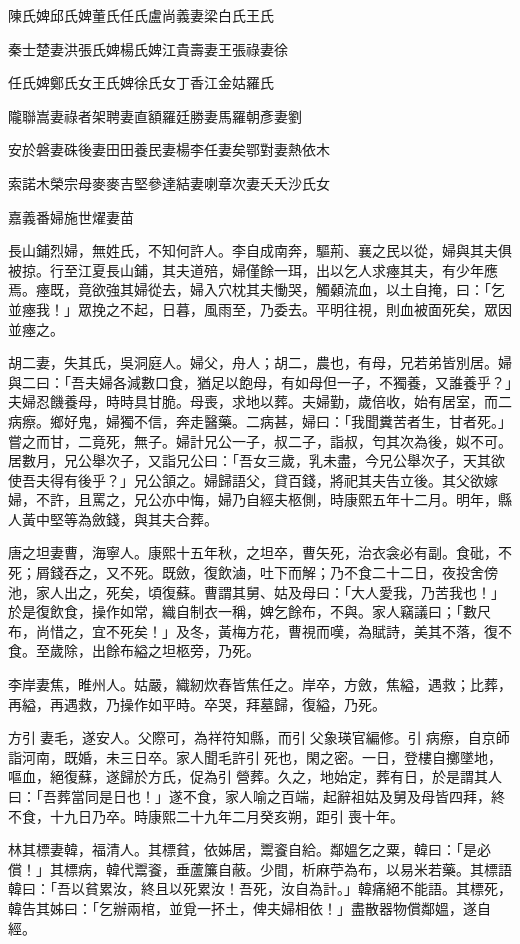 \begin{pinyinscope}
陳氏婢邱氏婢董氏任氏盧尚義妻梁白氏王氏

秦士楚妻洪張氏婢楊氏婢江貴壽妻王張祿妻徐

任氏婢鄭氏女王氏婢徐氏女丁香江金姑羅氏

隴聯嵩妻祿者架聘妻直額羅廷勝妻馬羅朝彥妻劉

安於磐妻硃後妻田田養民妻楊李任妻矣鄂對妻熱依木

索諾木榮宗母麥麥吉堅參達結妻喇章次妻夭夭沙氏女

嘉義番婦施世燿妻苗

長山鋪烈婦，無姓氏，不知何許人。李自成南奔，驅荊、襄之民以從，婦與其夫俱被掠。行至江夏長山鋪，其夫道殕，婦僅餘一珥，出以乞人求瘞其夫，有少年應焉。瘞既，竟欲強其婦從去，婦入穴枕其夫慟哭，觸顙流血，以土自掩，曰：「乞並瘞我！」眾挽之不起，日暮，風雨至，乃委去。平明往視，則血被面死矣，眾因並瘞之。

胡二妻，失其氏，吳洞庭人。婦父，舟人；胡二，農也，有母，兄若弟皆別居。婦與二曰：「吾夫婦各減數口食，猶足以飽母，有如母但一子，不獨養，又誰養乎？」夫婦忍饑養母，時時具甘脆。母喪，求地以葬。夫婦勤，歲倍收，始有居室，而二病瘵。鄉好鬼，婦獨不信，奔走醫藥。二病甚，婦曰：「我聞糞苦者生，甘者死。」嘗之而甘，二竟死，無子。婦計兄公一子，叔二子，詣叔，匄其次為後，姒不可。居數月，兄公舉次子，又詣兄公曰：「吾女三歲，乳未盡，今兄公舉次子，天其欲使吾夫得有後乎？」兄公頷之。婦歸語父，貸百錢，將祀其夫告立後。其父欲嫁婦，不許，且罵之，兄公亦中悔，婦乃自經夫柩側，時康熙五年十二月。明年，縣人黃中堅等為斂錢，與其夫合葬。

唐之坦妻曹，海寧人。康熙十五年秋，之坦卒，曹矢死，治衣衾必有副。食砒，不死；屑錢吞之，又不死。既斂，復飲滷，吐下而解；乃不食二十二日，夜投舍傍池，家人出之，死矣，頃復蘇。曹謂其舅、姑及母曰：「大人愛我，乃苦我也！」於是復飲食，操作如常，織自制衣一稱，婢乞餘布，不與。家人竊議曰；「數尺布，尚惜之，宜不死矣！」及冬，黃梅方花，曹視而嘆，為賦詩，美其不落，復不食。至歲除，出餘布縊之坦柩旁，乃死。

李岸妻焦，睢州人。姑嚴，織紉炊舂皆焦任之。岸卒，方斂，焦縊，遇救；比葬，再縊，再遇救，乃操作如平時。卒哭，拜墓歸，復縊，乃死。

方引妻毛，遂安人。父際可，為祥符知縣，而引父象瑛官編修。引病瘵，自京師詣河南，既婚，未三日卒。家人聞毛許引死也，閑之密。一日，登樓自擲墜地，嘔血，絕復蘇，遂歸於方氏，促為引營葬。久之，地始定，葬有日，於是謂其人曰：「吾葬當同是日也！」遂不食，家人喻之百端，起辭祖姑及舅及母皆四拜，終不食，十九日乃卒。時康熙二十九年二月癸亥朔，距引喪十年。

林其標妻韓，福清人。其標貧，依姊居，鬻餈自給。鄰媼乞之粟，韓曰：「是必償！」其標病，韓代鬻餈，垂蘆簾自蔽。少間，析麻苧為布，以易米若藥。其標語韓曰：「吾以貧累汝，終且以死累汝！吾死，汝自為計。」韓痛絕不能語。其標死，韓告其姊曰：「乞辦兩棺，並覓一抔土，俾夫婦相依！」盡散器物償鄰媼，遂自經。


\end{pinyinscope}
